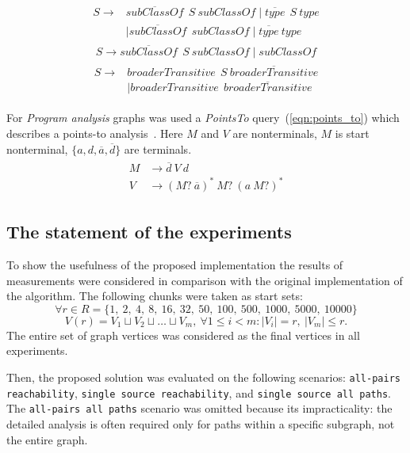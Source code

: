     \begin{align}
\begin{split}
\label{eqn:g_1}
S \to & \overline{\textit{subClassOf}} \ \ S \ \textit{subClassOf} \mid \overline{\textit{type}} \ \ S \ \textit{type}\\   & \mid \overline{\textit{subClassOf}} \ \ \textit{subClassOf} \mid \overline{\textit{type}} \ \textit{type}
\end{split}
\end{align}
\begin{align}
\label{eqn:g_2}
S \to \overline{\textit{subClassOf}} \ \ S \ \textit{subClassOf} \mid \textit{subClassOf}
\end{align}
\begin{align}
\begin{split}
\label{eqn:geo}
S \to & \textit{broaderTransitive} \ \  S \ \overline{\textit{broaderTransitive}} \\
      & \mid \textit{broaderTransitive} \ \  \overline{\textit{broaderTransitive}}
\end{split}
\end{align}

For \textit{Program analysis} graphs was used a \textit{PointsTo} query~(\ref{eqn:points_to}) which describes a points-to analysis~\cite{Zheng}. Here $M$ and $V$ are nonterminals, $M$ is start nonterminal, $\{a,d,\overline{a},\overline{d}\}$ are terminals. 
\begin{align}
\begin{split}
\label{eqn:points_to}
M & \to \overline{d} \ V \ d \\
V & \to (M? \ \overline{a})^* \ M? \ (a \ M?)^* 
\end{split}
\end{align}

\subsection{The statement of the experiments}
To show the usefulness of the proposed implementation the results of measurements were considered in comparison with the original implementation of the algorithm. 
The following chunks were taken as start sets:
$$ \forall r \in R = \{1,~2,~4,~8,~16,~32,~50,~100, ~500, ~1000, ~5000, ~10000\} $$
    $$ V(r) = V_1 \sqcup V_2 \sqcup \dots \sqcup V_m,~ \forall 1 \leq i < m: |V_i|=r,~|V_m| \leq r.$$
    The entire set of graph vertices was considered as the final vertices in all experiments.
    
Then, the proposed solution was evaluated on the following scenarios: \texttt{all-pairs reachability}, \texttt{single source reachability}, and \texttt{single source all paths}. The \texttt{all-pairs all paths} scenario was omitted because its impracticality: the detailed analysis is often required only for paths within a specific subgraph, not the entire graph.

